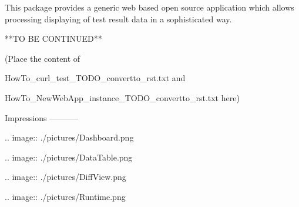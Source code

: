 




This package provides a generic web based open source application which allows processing displaying of test result data in a sophisticated way.

**TO BE CONTINUED**

(Place the content of

HowTo_curl_test_TODO_convertto_rst.txt and

HowTo_NewWebApp_instance_TODO_convertto_rst.txt here)


Impressions
-----------

.. image:: ./pictures/Dashboard.png

.. image:: ./pictures/DataTable.png

.. image:: ./pictures/DiffView.png

.. image:: ./pictures/Runtime.png


